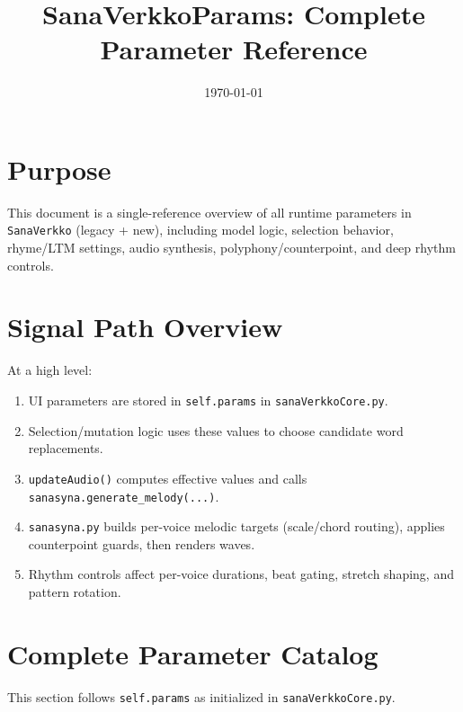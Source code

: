\documentclass[11pt,a4paper]{article}
\title{SanaVerkkoParams: Complete Parameter Reference}
\author{}
\date{\today}
\begin{document}
\maketitle

\section{Purpose}
This document is a single-reference overview of all runtime parameters in \texttt{SanaVerkko} (legacy + new), including model logic, selection behavior, rhyme/LTM settings, audio synthesis, polyphony/counterpoint, and deep rhythm controls.

\section{Signal Path Overview}
At a high level:
\begin{enumerate}
  \item UI parameters are stored in \texttt{self.params} in \texttt{sanaVerkkoCore.py}.
  \item Selection/mutation logic uses these values to choose candidate word replacements.
  \item \texttt{updateAudio()} computes effective values and calls \texttt{sanasyna.generate\_melody(...)}.
  \item \texttt{sanasyna.py} builds per-voice melodic targets (scale/chord routing), applies counterpoint guards, then renders waves.
  \item Rhythm controls affect per-voice durations, beat gating, stretch shaping, and pattern rotation.
\end{enumerate}

\section{Complete Parameter Catalog}
This section follows \texttt{self.params} as initialized in \texttt{sanaVerkkoCore.py}.
\end{document}
